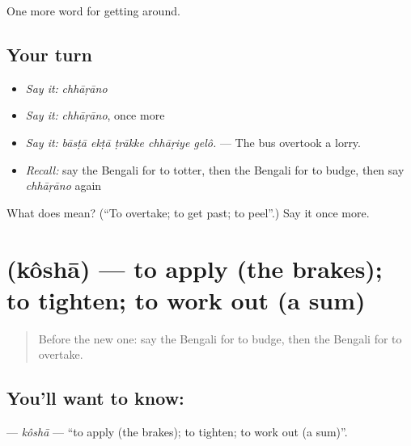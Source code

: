 \begin{grammarlens}[title={What you've built}]
One more word for getting around.
\end{grammarlens}

\subsection*{Your turn}
\begin{itemize}
\raggedright
  \item \emph{Say it:} \emph{chhāṛāno}
  \item \emph{Say it:} \emph{chhāṛāno}, once more
  \item \emph{Say it:} \emph{bāsṭā ekṭā ṭrākke chhāṛiye gelô.} — The bus overtook a lorry.
  \item \emph{Recall:} say the Bengali for to totter, then the Bengali for to budge, then say \emph{chhāṛāno} again
\end{itemize}

\begin{tcolorbox}[breakable,colback=teal!4,colframe=teal!35!black,title={Before you move on}]
What does  mean? (\textquotedblleft{}To overtake; to get past; to peel\textquotedblright{}.) Say it once more.
\end{tcolorbox}
\section[\texorpdfstring{\bn{কষা} (kôshā)}{কষা (kôshā)}]{ (kôshā) — to apply (the brakes); to tighten; to work out (a sum)}

\label{lesson:BN-C391-kosha}



\begin{quote}
Before the new one: say the Bengali for to budge, then the Bengali for to overtake.
\end{quote}

\subsection*{You'll want to know: }
\textbf{} — \emph{kôshā} — \textquotedblleft{}to apply (the brakes); to tighten; to work out (a sum)\textquotedblright{}.

\begin{quote}
      
\end{quote}

